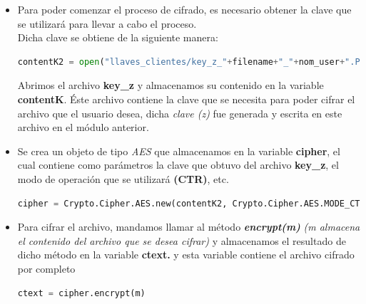 \begin{itemize}

	\item Para poder comenzar el proceso de cifrado, es necesario obtener la clave que se utilizará para llevar a cabo el proceso. \\ Dicha clave se obtiene de la siguiente manera: 

	\begin{lstlisting}[language=Python,frame=single, keywordstyle=\color{blue},breaklines=true,showstringspaces=false]
 	contentK2 = open("llaves_clientes/key_z_"+filename+"_"+nom_user+".PEM", "rb").read()
	\end{lstlisting}

Abrimos el archivo \textbf{key\_z} y almacenamos su contenido en la variable \textbf{contentK}. Éste archivo contiene la clave que se necesita para poder cifrar el archivo que el usuario desea, dicha \textit{clave (z)} fue generada y escrita en este archivo en el módulo anterior. 

	\item Se crea un objeto de tipo \textit{AES} que almacenamos en la variable \textbf{cipher}, el cual contiene como parámetros la clave que obtuvo del archivo  \textbf{key\_z}, el modo de operación que se utilizará \textbf{(CTR)}, etc.
			
\begin{lstlisting}[language=Python,frame=single, keywordstyle=\color{blue},breaklines=true,showstringspaces=false]
cipher = Crypto.Cipher.AES.new(contentK2, Crypto.Cipher.AES.MODE_CTR, counter=ctr)
\end{lstlisting}

	\item Para cifrar el archivo, mandamos llamar al método \textbf{\textit{encrypt(m)}} \textit{(m almacena el contenido del archivo que se desea cifrar)} y almacenamos el resultado de dicho método en la variable \textbf{ctext.} y esta variable contiene el archivo cifrado por completo
			
	\begin{lstlisting}[language=Python,frame=single, keywordstyle=\color{blue},breaklines=true,showstringspaces=false]
		ctext = cipher.encrypt(m)
	\end{lstlisting}



\end{itemize}


